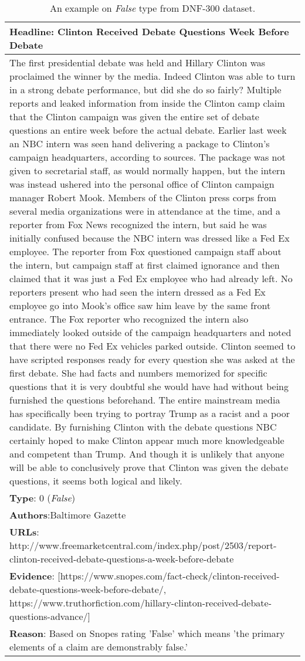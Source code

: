 \documentclass[11pt,a4paper]{article}
\begin{document}
\begin{table*}
\centering
\begin{tabular}{p{15cm}}
\hline
\textbf{Headline}: Clinton Received Debate Questions Week Before Debate\\
\hline 
The first presidential debate was held and Hillary Clinton was proclaimed the winner by the media. Indeed Clinton was able to turn in a strong debate performance, but did she do so fairly? Multiple reports and leaked information from inside the Clinton camp claim that the Clinton campaign was given the entire set of debate questions an entire week before the actual debate. Earlier last week an NBC intern was seen hand delivering a package to Clinton’s campaign headquarters, according to sources. The package was not given to secretarial staff, as would normally happen, but the intern was instead ushered into the personal office of Clinton campaign manager Robert Mook. Members of the Clinton press corps from several media organizations were in attendance at the time, and a reporter from Fox News recognized the intern, but said he was initially confused because the NBC intern was dressed like a Fed Ex employee. The reporter from Fox questioned campaign staff about the intern, but campaign staff at first claimed ignorance and then claimed that it was just a Fed Ex employee who had already left. No reporters present who had seen the intern dressed as a Fed Ex employee go into Mook’s office saw him leave by the same front entrance. The Fox reporter who recognized the intern also immediately looked outside of the campaign headquarters and noted that there were no Fed Ex vehicles parked outside. Clinton seemed to have scripted responses ready for every question she was asked at the first debate. She had facts and numbers memorized for specific questions that it is very doubtful she would have had without being furnished the questions beforehand. The entire mainstream media has specifically been trying to portray Trump as a racist and a poor candidate. By furnishing Clinton with the debate questions NBC certainly hoped to make Clinton appear much more knowledgeable and competent than Trump. And though it is unlikely that anyone will be able to conclusively prove that Clinton was given the debate questions, it seems both logical and likely.\\
\hline
\textbf{Type}: 0 (\textit{False})\\
\textbf{Authors}:Baltimore Gazette\\
\textbf{URLs}: http://www.freemarketcentral.com/index.php/post/2503/report-clinton-received-debate-questions-a-week-before-debate\\
\hline
\textbf{Evidence}: [https://www.snopes.com/fact-check/clinton-received-debate-questions-week-before-debate/, https://www.truthorfiction.com/hillary-clinton-received-debate-questions-advance/]\\
\hline
\textbf{Reason}: Based on Snopes rating 'False' which means 'the primary elements of a claim are demonstrably false.'\\
\hline
\end{tabular}
\caption{\label{tab:dnf300_false}An example on \textit{False} type from DNF-300 dataset. 
}
\end{table*}
\end{document}
